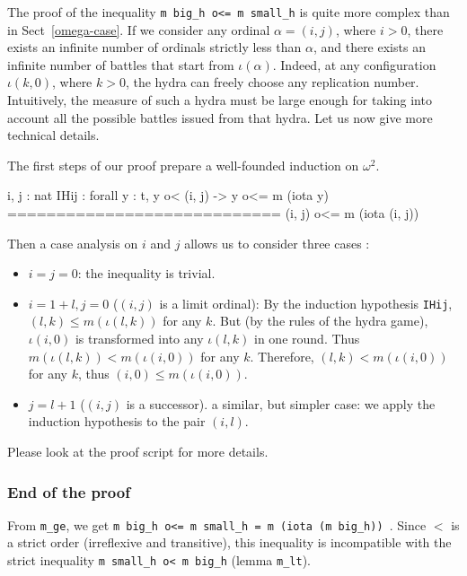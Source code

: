 The proof of the inequality \texttt{m big\_h o<= m small\_h} is quite more complex than in Sect~\ref{omega-case}.  If we consider any ordinal $\alpha=(i,j)$, where $i>0$, there exists an infinite number of
ordinals strictly less than $\alpha$, and there exists an infinite number of battles that start from
$\iota(\alpha)$. Indeed, at any configuration $\iota(k,0)$, where $k>0$, the hydra can freely choose any replication number. Intuitively, the measure of such a hydra must be large enough for taking into account
all the possible battles issued from that hydra.
Let us now give more technical details.

The first steps of our proof prepare a well-founded induction on $\omega^2$.




\begin{Coqanswer}
  i, j : nat
  IHij : forall y : t, y o< (i, j) -> y o<= m (iota y)
  ============================
  (i, j) o<= m (iota (i, j))

\end{Coqanswer}


Then a case analysis on $i$ and $j$ allows us to
consider three cases :

\begin{itemize}
\item $i=j=0$: the inequality is trivial.
\item $i=1+l, j=0$ ($(i,j)$ is a limit ordinal): By the induction hypothesis \texttt{IHij},
  $(l,k)\leq m(\iota(l,k))$ for any $k$. But (by the rules of the hydra game), $\iota(i,0)$ is transformed into any $\iota(l,k)$ in one round. Thus $m(\iota(l,k)) < m(\iota(i,0))$ for any $k$.
  Therefore, $(l,k) <  m(\iota(i,0))$ for any $k$, thus
  $(i,0) \leq m(\iota(i,0))$.
 \item $j= l+1$  ($(i,j)$ is a successor).  a similar, but simpler case: we apply the induction hypothesis to the pair $(i,l)$.
 \end{itemize}

 Please look at the proof script for more details.
 
 

\subsubsection{End of the proof}
From \texttt{m\_ge}, we get \texttt{m big\_h o<= m small\_h = m (iota (m big\_h)) }. 
Since $<$ is a strict order (irreflexive  and transitive), this inequality is incompatible with the strict inequality  \texttt{m small\_h o< m big\_h} (lemma \texttt{m\_lt}).


